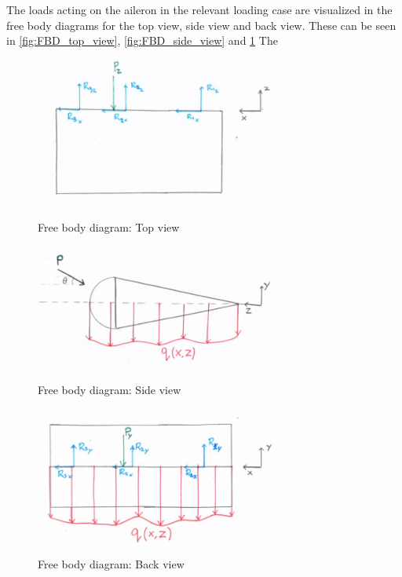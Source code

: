The loads acting on the aileron in the relevant loading case are visualized in the free body diagrams for the top view, side view and back view. These can be seen in \ref{fig:FBD_top_view}, \ref{fig:FBD_side_view} and \ref{fig:FBD_back_view}
The 
\par
\begin{figure}[H]
\begin{minipage}[b]{0.45\linewidth}
\centering
\includegraphics[width=8cm]{Images/FBD_top_view.JPG}
\caption{Free body diagram: Top view}
\label{fig:FBD_top_view}
\end{minipage}
\hspace{0.5cm}
\begin{minipage}[b]{0.45\linewidth}
\centering
\includegraphics[width=8cm]{Images/FBD_side_view.JPG}
\caption{Free body diagram: Side view}
\label{fig:FBD_side_view}
\end{minipage}
\begin{minipage}[b]{\linewidth}
\centering
\includegraphics[width=8cm]{Images/FBD_back_view.JPG}
\caption{Free body diagram: Back view}
\label{fig:FBD_back_view}
\end{minipage}
\end{figure}

